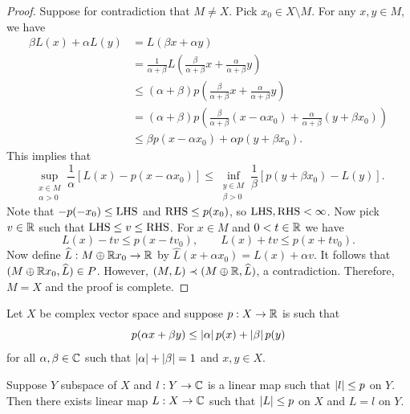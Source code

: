 \documentclass[a4paper]{article}
\begin{document}
\begin{proof}
Suppose for contradiction that $M \neq X$. Pick $x_0 \in X 
\setminus M$. For any $x, y \in M$, we have 
\[
\begin{aligned}
\beta L(x) + \alpha L(y) 
&= L(\beta x + \alpha y) \\ 
&= \frac{1}{\alpha + \beta} L \left( 
  \frac{\beta}{\alpha + \beta} x + \frac{\alpha}{\alpha + \beta} y 
 \right)\\ 
& \leq (\alpha + \beta) p \left( 
  \frac{\beta}{\alpha + \beta} x + \frac{\alpha}{\alpha + \beta} y 
 \right)\\ 
&= (\alpha + \beta) p \left( 
  \frac{\beta}{\alpha + \beta} (x - \alpha x_0)
  + \frac{\alpha}{\alpha + \beta} (y + \beta x_0) 
 \right)\\ 
& \leq \beta p(x - \alpha x_0) + \alpha p(y + \beta x_0).
\end{aligned}
\]
This implies that 
\[
\sup_{\substack{x \in M \\ \alpha > 0}} 
\frac{1}{\alpha} \left[ L(x) - p(x - \alpha x_0) \right] 
\leq \inf_{\substack{y \in M \\ \beta > 0}} 
\frac{1}{\beta} \left[ p(y + \beta x_0) - L(y) \right].
\]
Note that $-p(-x_0) \leq \operatorname{LHS}$ and $\operatorname{RHS} \leq p(x_0)$, so 
$\operatorname{LHS}, \operatorname{RHS} < \infty$. Now pick $v \in \mathbb{R}$ such that 
$\operatorname{LHS} \leq v \leq \operatorname{RHS}$. For $x \in M$ and $0 < t \in \mathbb{R}$ we have 
\[
L(x) - tv \leq p(x - t v_0), \qquad 
L(x) + tv \leq p(x + t v_0). 
\]
Now define $\widehat{L}: M \oplus \mathbb{R} x_0 \to \mathbb{R}$ by 
$\hat{L}(x + \alpha x_0) = L(x) + \alpha v$. It follows that 
$(M \oplus \mathbb{R} x_0 , \widehat{L}) \in P$. However, $(M, L) \prec 
(M \oplus \mathbb{R}, \widehat{L})$, a contradiction. Therefore, $M = X$ 
and the proof is complete.

\end{proof}

\begin{thm}
Let $X$ be complex vector space and suppose $p: X \to \mathbb{R}$ 
is such that 
\[
p(\alpha x + \beta y) \leq \left\lvert \alpha\right\rvert p(x) + \left\lvert \beta\right\rvert p(y)
\]
for all $\alpha, \beta \in \mathbb{C}$ such that $\left\lvert \alpha\right\rvert + 
\left\lvert \beta\right\rvert=1$ and $x, y \in X$.

Suppose $Y$ subspace of $X$ and $l: Y \to \mathbb{C}$ is a linear map 
such that $\left\lvert l\right\rvert \leq p$ on $Y$. Then there exists linear map 
$L: X \to \mathbb{C}$ such that $\left\lvert L\right\rvert \leq p$ on $X$ and  
$L = l$ on $Y$.
\end{thm}
\end{document}
